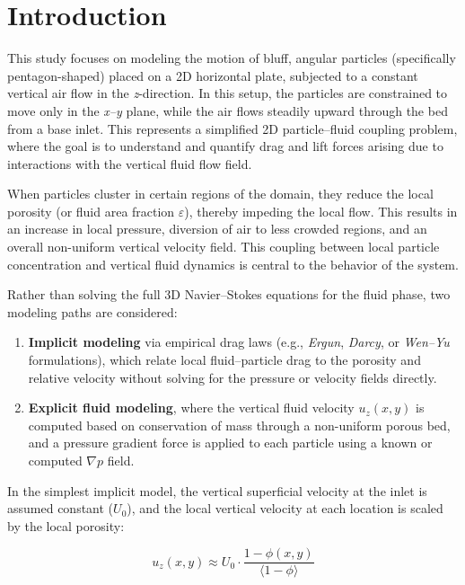 \section*{Introduction}

This study focuses on modeling the motion of bluff, angular particles (specifically pentagon-shaped) placed on a 2D horizontal plate, subjected to a constant vertical air flow in the \textit{z}-direction. In this setup, the particles are constrained to move only in the \textit{x--y} plane, while the air flows steadily upward through the bed from a base inlet. This represents a simplified 2D particle--fluid coupling problem, where the goal is to understand and quantify drag and lift forces arising due to interactions with the vertical fluid flow field.

When particles cluster in certain regions of the domain, they reduce the local porosity (or fluid area fraction $\varepsilon$), thereby impeding the local flow. This results in an increase in local pressure, diversion of air to less crowded regions, and an overall non-uniform vertical velocity field. This coupling between local particle concentration and vertical fluid dynamics is central to the behavior of the system.

Rather than solving the full 3D Navier--Stokes equations for the fluid phase, two modeling paths are considered:

\begin{enumerate}
    \item \textbf{Implicit modeling} via empirical drag laws (e.g., \textit{Ergun}, \textit{Darcy}, or \textit{Wen--Yu} formulations), which relate local fluid--particle drag to the porosity and relative velocity without solving for the pressure or velocity fields directly.
    
    \item \textbf{Explicit fluid modeling}, where the vertical fluid velocity $u_z(x, y)$ is computed based on conservation of mass through a non-uniform porous bed, and a pressure gradient force is applied to each particle using a known or computed $\nabla p$ field.
\end{enumerate}

In the simplest implicit model, the vertical superficial velocity at the inlet is assumed constant ($U_0$), and the local vertical velocity at each location is scaled by the local porosity:

\[
u_z(x, y) \approx U_0 \cdot \frac{1 - \phi(x, y)}{\langle 1 - \phi \rangle}
\]

